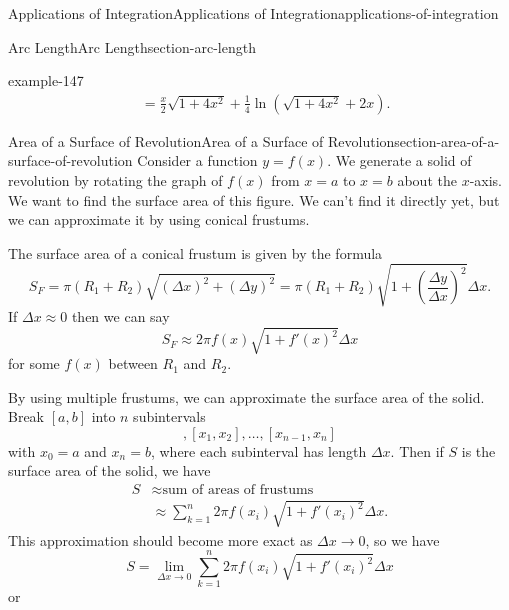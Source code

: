 \documentclass[oneside,10pt,]{book}
\numberwithin{equation}{section}
\newcommand{\amp}{&}
\begin{document}
\begin{chapterptx}{Applications of Integration}{}{Applications of Integration}{}{}{applications-of-integration}
\begin{sectionptx}{Arc Length}{}{Arc Length}{}{}{section-arc-length}
\begin{example}{}{example-147}
\begin{align*}
\amp = \frac{x}{2}\sqrt{1 + 4x^{2}} + \frac{1}{4}\ln(\sqrt{1 + 4x^{2}} + 2x). 
\end{align*}
%
\end{example}
\end{sectionptx}
%
%
\typeout{************************************************}
\typeout{************************************************}
%
\begin{sectionptx}{Area of a Surface of Revolution}{}{Area of a Surface of Revolution}{}{}{section-area-of-a-surface-of-revolution}
\hypertarget{p-661}{}%
Consider a function \(y=f(x)\). We generate a solid of revolution by rotating the graph of \(f(x)\) from \(x=a\) to \(x=b\) about the \(x\)-axis. We want to find the surface area of this figure. We can't find it directly yet, but we can approximate it by using conical frustums.%
\par
\hypertarget{p-662}{}%
The surface area of a conical frustum is given by the formula%
\begin{equation*}
S_{F}=\pi(R_{1}+R_{2})\sqrt{(\Delta x)^{2}+(\Delta y)^{2}}=\pi(R_{1}+R_{2})\sqrt{1+\left(\frac{\Delta y}{\Delta x}\right)^{2}}\Delta x.
\end{equation*}
If \(\Delta x\approx0\) then we can say%
\begin{equation*}
S_{F}\approx2\pi f(x)\sqrt{1+f'(x)^{2}}\Delta x
\end{equation*}
for some \(f(x)\) between \(R_{1}\) and \(R_{2}\).%
\par
\hypertarget{p-663}{}%
By using multiple frustums, we can approximate the surface area of the solid. Break \([a,b]\) into \(n\) subintervals%
\begin{equation*}
[x_{0},x_{1}],[x_{1},x_{2}],\ldots,[x_{n-1},x_{n}]
\end{equation*}
with \(x_{0}=a\) and \(x_{n}=b\), where each subinterval has length \(\Delta x\). Then if \(S\) is the surface area of the solid, we have%
\begin{align*}
S\amp\approx\text{sum of areas of frustums}\\
\amp\approx\sum_{k=1}^{n}2\pi f(x_{i})\sqrt{1+f'(x_{i})^{2}}\Delta x.
\end{align*}
This approximation should become more exact as \(\Delta x \to 0\), so we have%
\begin{equation*}
S=\lim_{\Delta x\to0}\sum_{k=1}^{n}2\pi f(x_{i})\sqrt{1+f'(x_{i})^{2}}\Delta x
\end{equation*}
or%
\begin{equation*}

\end{equation*}
\end{sectionptx}
\end{chapterptx}
\end{document}
